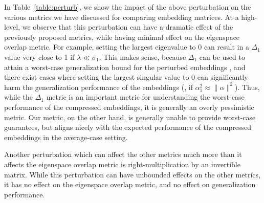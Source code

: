 In Table~\ref{table:perturb}, we show the impact of the above perturbation on the various metrics we have discussed for comparing embedding matrices.
At a high-level, we observe that this perturbation can have a dramatic effect of the previously proposed metrics, while having minimal effect on the eigenspace overlap metric.
For example, setting the largest eigenvalue to 0 can result in a $\Delta_1$ value very close to 1 if $\lambda \ll \sigma_1$.
This makes sense, because $\Delta_1$ can be used to attain a worst-case generalization bound for the perturbed embeddings \citep{lprff18}, and there exist cases where setting the largest singular value to 0 can significantly harm the generalization performance of the embeddings (\eg, if $\alpha_1^2 \approx \|\alpha\|^2$).
Thus, while the $\Delta_1$ metric is an important metric for understanding the worst-case performance of the compressed embeddings, it is generally an overly pessimistic metric.
Our metric, on the other hand, is generally unable to provide worst-case guarantees, but aligns nicely with the expected performance of the compressed embeddings in the average-case setting.

Another perturbation which can affect the other metrics much more than it affects the eigenspace overlap metric is right-multiplication by an invertible matrix.
While this perturbation can have unbounded effects on the other metrics, it has no effect on the eigenspace overlap metric, and no effect on generalization performance.

